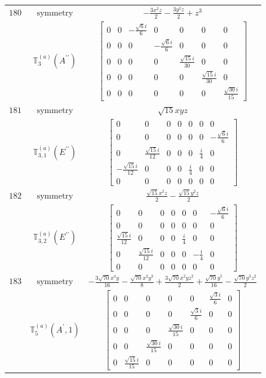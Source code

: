 \documentclass[fleqn,8pt,landscape]{jsarticle}
\begin{document}
\begin{longtable}{ccc}
$ 180 $ & $ \text{symmetry} $ & $ - \frac{3 x^{2} z}{2} - \frac{3 y^{2} z}{2} + z^{3} $ \\
$  $ & $ \mathbb{T}_{3}^{(a)}(A^{\prime\prime}) $ & $ \begin{bmatrix} 0 & 0 & - \frac{\sqrt{6} i}{6} & 0 & 0 & 0 & 0 \\ 0 & 0 & 0 & - \frac{\sqrt{6} i}{6} & 0 & 0 & 0 \\ 0 & 0 & 0 & 0 & \frac{\sqrt{15} i}{30} & 0 & 0 \\ 0 & 0 & 0 & 0 & 0 & \frac{\sqrt{15} i}{30} & 0 \\ 0 & 0 & 0 & 0 & 0 & 0 & \frac{\sqrt{30} i}{15} \end{bmatrix} $ \\ \hline
$ 181 $ & $ \text{symmetry} $ & $ \sqrt{15} x y z $ \\
$  $ & $ \mathbb{T}_{3,1}^{(a)}(E^{\prime\prime}) $ & $ \begin{bmatrix} 0 & 0 & 0 & 0 & 0 & 0 & 0 \\ 0 & 0 & 0 & 0 & 0 & 0 & - \frac{\sqrt{6} i}{6} \\ 0 & \frac{\sqrt{15} i}{12} & 0 & 0 & 0 & \frac{i}{4} & 0 \\ - \frac{\sqrt{15} i}{12} & 0 & 0 & 0 & \frac{i}{4} & 0 & 0 \\ 0 & 0 & 0 & 0 & 0 & 0 & 0 \end{bmatrix} $ \\ \hline
$ 182 $ & $ \text{symmetry} $ & $ \frac{\sqrt{15} x^{2} z}{2} - \frac{\sqrt{15} y^{2} z}{2} $ \\
$  $ & $ \mathbb{T}_{3,2}^{(a)}(E^{\prime\prime}) $ & $ \begin{bmatrix} 0 & 0 & 0 & 0 & 0 & 0 & - \frac{\sqrt{6} i}{6} \\ 0 & 0 & 0 & 0 & 0 & 0 & 0 \\ \frac{\sqrt{15} i}{12} & 0 & 0 & 0 & \frac{i}{4} & 0 & 0 \\ 0 & \frac{\sqrt{15} i}{12} & 0 & 0 & 0 & - \frac{i}{4} & 0 \\ 0 & 0 & 0 & 0 & 0 & 0 & 0 \end{bmatrix} $ \\ \hline
$ 183 $ & $ \text{symmetry} $ & $ - \frac{3 \sqrt{70} x^{4} y}{16} - \frac{\sqrt{70} x^{2} y^{3}}{8} + \frac{3 \sqrt{70} x^{2} y z^{2}}{2} + \frac{\sqrt{70} y^{5}}{16} - \frac{\sqrt{70} y^{3} z^{2}}{2} $ \\
$  $ & $ \mathbb{T}_{5}^{(a)}(A^{\prime},1) $ & $ \begin{bmatrix} 0 & 0 & 0 & 0 & 0 & \frac{\sqrt{3} i}{6} & 0 \\ 0 & 0 & 0 & 0 & \frac{\sqrt{3} i}{6} & 0 & 0 \\ 0 & 0 & 0 & \frac{\sqrt{30} i}{15} & 0 & 0 & 0 \\ 0 & 0 & \frac{\sqrt{30} i}{15} & 0 & 0 & 0 & 0 \\ 0 & \frac{\sqrt{15} i}{15} & 0 & 0 & 0 & 0 & 0 \end{bmatrix} $ \\ \hline

\end{longtable}
\end{document}
